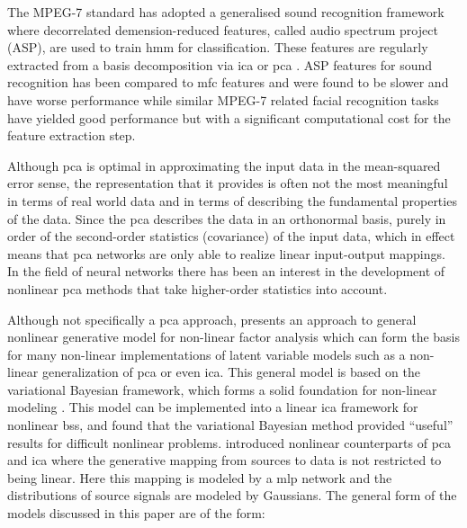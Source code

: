 The MPEG-7 standard\cite{Casey2001} has adopted a generalised sound recognition framework where decorrelated demension-reduced features, called audio spectrum project (ASP), are used to train \gls{hmm} for classification\cite{Kim2006}. These features are regularly extracted from a basis decomposition via \gls{ica} or \gls{pca} \cite{Casey2001}\cite{Kim2003}\cite{Kim2006}. ASP features for sound recognition has been compared to \gls{mfc} features and were found to be slower and have worse performance \cite{Kim2004} while similar MPEG-7 related facial recognition tasks have yielded good performance but with a significant computational cost for the feature extraction step\cite{Zaeri2006}.

Although \gls{pca} is optimal in approximating the input data in the mean-squared error sense, the representation that it provides is often not the most meaningful in terms of real world data and in terms of describing the fundamental properties of the data. Since the \gls{pca} describes the data in an orthonormal basis, purely in order of the second-order statistics (covariance) of the input data\citep{Oja1995}, which in effect means that \gls{pca} networks are only able to realize linear input-output mappings\citep{Karhunen1995}. In the field of neural networks there has been an interest in the development of nonlinear \gls{pca} methods that take higher-order statistics into account.

Although not specifically a \gls{pca} approach, \cite{Honkela2005} presents an approach to general nonlinear generative model for non-linear factor analysis which can form the basis for many non-linear implementations of latent variable models such as a non-linear generalization of \gls{pca} or even \gls{ica}. This general model is based on the variational Bayesian framework, which forms a solid foundation for non-linear modeling \citep{Honkela2005}. This model can be implemented into a linear \gls{ica} framework for nonlinear \gls{bss}, and \cite{Valpola2003} found that the variational Bayesian method provided ``useful'' results for difficult nonlinear problems. \citep{Lappalainen2000} introduced nonlinear counterparts of \gls{pca} and \gls{ica} where the generative mapping from sources to data is not restricted to being linear. Here this mapping is modeled by a \gls{mlp} network and the distributions of source signals are modeled by Gaussians. The general form of the models discussed in this paper are of the form:

